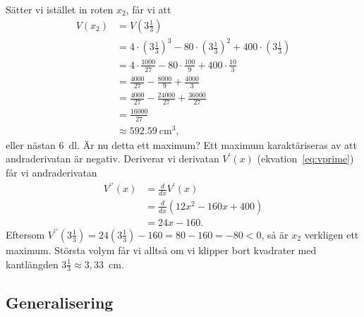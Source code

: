 \documentclass[a4paper,12pt]{article}
\begin{document}
Sätter vi istället in roten $x_2$, får vi att
%
\begin{align*}
  V(x_2) &= V\left(3\frac{1}{3}\right) \\
%
         &= 4 \cdot    \left(3\frac{1}{3}\right)^3 -
            80 \cdot   \left(3\frac{1}{3}\right)^2 +
            400 \cdot  \left(3\frac{1}{3}\right) \\
%
         &= 4 \cdot   \frac{1000}{27} -
            80 \cdot  \frac{100}{9}+
            400 \cdot \frac{10}{3} \\
%
         &= \frac{4000}{27} -
            \frac{8000}{9}+
            \frac{4000}{3} \\
%
         &= \frac{4000}{27} -
            \frac{24000}{27}+
            \frac{36000}{27} \\
%
         &= \frac{16000}{27} \\
%
         &\approx 592.59~\text{cm}^3, 
\end{align*}
%
eller nästan $6$~dl. Är nu detta ett maximum? Ett maximum karaktäriseras
av att andraderivatan är negativ. Deriverar vi derivatan $V^\prime(x)$
(ekvation~\ref{eq:vprime}) får vi andraderivatan
%
\begin{align*}
  V^{\prime\prime}(x) &= \frac{d}{dx} V^\prime(x) \\
                      &= \frac{d}{dx} (12x^2 - 160x + 400) \\
                      &= 24x - 160.
\end{align*}
%
Eftersom
  $V^{\prime\prime}(3\frac{1}{3}) = 24\left(3\frac{1}{3}\right)-160
                                  = 80 - 160 
                                  = -80 
                                  < 0$, 
så är $x_2$ verkligen ett
maximum. Största volym får vi alltså om vi klipper bort kvadrater med
kantlängden $3\frac{1}{3} \approx 3,33$~cm.


\subsection{Generalisering}
\label{sec:gen}
\end{document}
